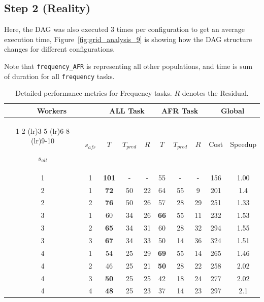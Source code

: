 \documentclass[a4paper, 12pt]{article}
\begin{document}
	\subsection*{Step 2 (Reality)}
	Here, the DAG was also executed 3 times per configuration to get an average execution time, Figure~\ref{fig:grid_analysis_9} is showing how the DAG structure changes for different configurations.
	
	Note that \texttt{frequency\_AFR} is representing all other populations, and time is sum of duration for all \texttt{frequency} tasks.
	
	\begin{table}[h!]
		\centering
		
		\setlength{\tabcolsep}{10pt} 
		\small %
		
		\begin{tabular}{cccccccccc}
			\toprule
			\multicolumn{2}{c}{\textbf{Workers}} & \multicolumn{3}{c}{\textbf{ALL Task}} & \multicolumn{3}{c}{\textbf{AFR Task}} & \multicolumn{2}{c}{\textbf{Global}} \\
			\cmidrule(lr){1-2} \cmidrule(lr){3-5} \cmidrule(lr){6-8} \cmidrule(lr){9-10}
			
			$s_{all}$ & $s_{afr}$ & 
			$T$ & $T_{pred}$ & $R$ & 
			$T$ & $T_{pred}$ & $R$ & 
			Cost & Speedup \\
			\midrule
			
			1 & 1 & \textbf{101} & - & - & 55 & - & - & 156 & 1.00 \\
			2 & 1 & \textbf{72} & 50 & 22 & 64 & 55 & 9 & 201 & 1.4 \\
			2 & 2 & \textbf{76} & 50 & 26 & 57 & 28 & 29 & 251 & 1.33 \\
			3 & 1 & 60 & 34 & 26 & \textbf{66} & 55 & 11 & 232 & 1.53 \\
			3 & 2 & \textbf{65} & 34 & 31 & 60 & 28 & 32 & 294 & 1.55 \\
			3 & 3 & \textbf{67} & 34 & 33 & 50 & 14 & 36 & 324 & 1.51 \\
			4 & 1 & 54 & 25 & 29 & \textbf{69} & 55 & 14 & 265 & 1.46 \\
			4 & 2 & 46 & 25 & 21 & \textbf{50} & 28 & 22 & 258 & 2.02 \\
			4 & 3 & \textbf{50} & 25 & 25 & 42 & 18 & 24 & 277 & 2.02 \\
			4 & 4 & \textbf{48} & 25 & 23 & 37 & 14 & 23 & 297 & 2.1 \\
			\bottomrule
		\end{tabular}
		
		\caption{Detailed performance metrics for Frequency tasks. $R$ denotes the Residual.}
		\label{tab:results2}
	\end{table}
	
\end{document}
